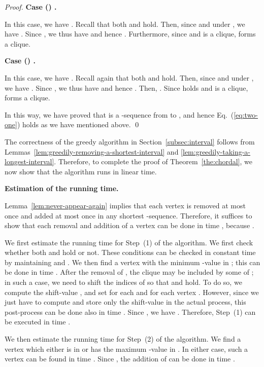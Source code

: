 \documentclass{llncs}
\newcounter{one}
\newcounter{two}
\newcommand{\two}{{\rm \roman{two}}}
\newcounter{three}
\newcommand{\three}{{\rm \roman{three}}}
\begin{document}
\begin{proof}
\noindent
	{\bf Case (\two) .} 

	In this case, we have . 
	Recall that both  and  hold. 
	Then, since  and  under , we have .
	Since , we thus have  and hence . 
	Furthermore, since  and  is a clique,  forms a clique.
\medskip

\noindent
	{\bf Case (\three) .} 
	
	In this case, we have . 
	Recall again that both  and  hold. 
	Then, since  and  under , we have .
	Since , we thus have  and hence . 
	Then, .
	Since  holds and  is a clique,  forms a clique.
\medskip

	In this way, we have proved that  is a -sequence from  to , and hence Eq.~(\ref{eq:two-one}) holds as we have mentioned above. 
\qed
\end{proof}




	The correctness of the greedy algorithm in Section~\ref{subsec:interval} follows from Lemmas~\ref{lem:greedily-removing-a-shortest-interval} and \ref{lem:greedily-taking-a-longest-interval}.
	Therefore, to complete the proof of Theorem~\ref{the:chordal}, we now show that the algorithm runs in linear time. 
\medskip

\noindent
	{\bf Estimation of the running time.}

	Lemma~\ref{lem:never-appear-again} implies that each vertex is removed at most once and added at most once in any shortest -sequence.
	Therefore, it suffices to show that each removal and addition of a vertex  can be done in time , because .

	We first estimate the running time for Step~(1) of the algorithm. 
	We first check whether both  and  hold or not. 
	These conditions can be checked in constant time by maintaining  and .
	We then find a vertex  with the minimum -value in ; this can be done in time .
	After the removal of , the clique  may be included by some of ; 
in such a case, we need to shift the indices of  so that  and  hold. 
	To do so, we compute the shift-value , and set  for each  and  for each vertex .
	However, since we just have to compute and store only the shift-value  in the actual process, this post-process can be done also in time .
	Since , we have .
	Therefore, Step~(1) can be executed in time .

	We then estimate the running time for Step~(2) of the algorithm. 
	We find a vertex  which either is in  or has the maximum -value in .
	In either case, such a vertex  can be found in time .
	Since , the addition of  can be done in time .
\end{document}
